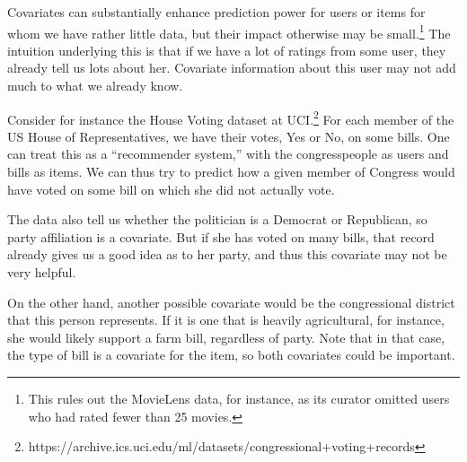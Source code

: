 Covariates can substantially enhance prediction power for users or items
for whom we have rather little data, but their impact otherwise may be
small.\footnote{This rules out the MovieLens data, for instance, as its
curator omitted users who had rated fewer than 25 movies.}  The
intuition underlying this is that if we have a lot of ratings from some
user, they already tell us lots about her.  Covariate information
about this user may not add much to what we already know.

Consider for instance the House Voting dataset at
UCI.\footnote{https://archive.ics.uci.edu/ml/datasets/congressional+voting+records}
For each member of the US House of Representatives, we have their votes,
Yes or No, on some bills.  One can treat this as a ``recommender
system,'' with the congresspeople as users and bills as items.  We can
thus try to predict how a given member of Congress would have voted on
some bill on which she did not actually vote.

The data also tell us whether the politician is a Democrat or
Republican, so party affiliation is a covariate.  But if she has voted
on many bills, that record already gives us a good idea as to her party,
and thus this covariate may not be very helpful.

On the other hand, another possible covariate would be the congressional
district that this person represents.  If it is one that is heavily
agricultural, for instance, she would likely support a farm bill,
regardless of party.  Note that in that case, the type of bill is a
covariate for the item, so both covariates could be important.

